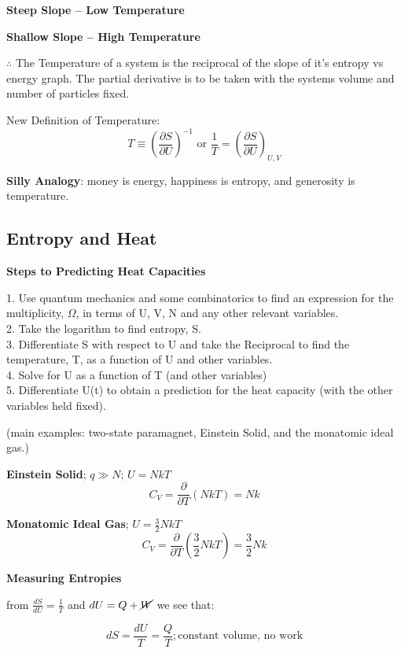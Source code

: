 \documentclass[11pt]{article}
\theoremstyle{definition}
\begin{document}
\textbf{Steep Slope -- Low Temperature}

\textbf{Shallow Slope -- High Temperature}

$\therefore$ The Temperature of a system is the reciprocal of the slope of it's entropy vs energy graph. The partial derivative is to be taken with the systems volume and number of particles fixed.
\begin{shaded}
New Definition of Temperature:
\begin{equation}
    T \equiv \left( \frac{\partial S}{\partial U} \right)^{-1} \text{   or   } \frac{1}{T} = \left(\frac{\partial S}{\partial U}\right)_{U, V}
\end{equation}
\end{shaded}

\textbf{Silly Analogy}: money is energy, happiness is entropy, and generosity is temperature.

\subsection{Entropy and Heat}

\textbf{Steps to Predicting Heat Capacities}

1. Use quantum mechanics and some combinatorics to find an expression for the multiplicity, $\Omega$, in terms of U, V, N and any other relevant variables.\\
2. Take the logarithm to find entropy, S.\\
3. Differentiate S with respect to U and take the Reciprocal to find the temperature, T, as a function of U and other variables.\\
4. Solve for U as a function of T (and other variables)\\
5. Differentiate U(t) to obtain a prediction for the heat capacity (with the other variables held fixed).

(main examples: two-state paramagnet, Einstein Solid, and the monatomic ideal gas.)

\textbf{Einstein Solid}; $q \gg N$; $U=NkT$
\[C_V = \frac{\partial}{\partial T}(NkT) = Nk\]

\textbf{Monatomic Ideal Gas}; $U=\frac{3}{2}NkT$
\[C_V = \frac{\partial}{\partial T}(\frac{3}{2}NkT) = \frac{3}{2}Nk\]

\textbf{Measuring Entropies}

from $\frac{dS}{dU}=\frac{1}{T}$ and $dU = Q + \cancel{W} $ we see that:

\begin{equation}
    dS = \frac{dU}{T} = \frac{Q}{T} ; \text{constant volume, no work}
\end{equation}
\end{document}
